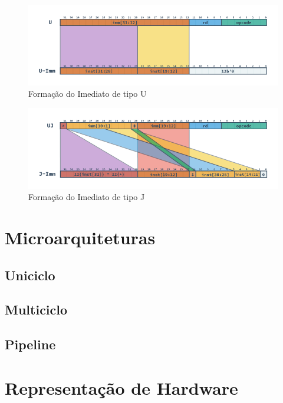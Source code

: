         \begin{figure}[H]
        \centering
            \includegraphics[width=.9\linewidth]{../images/RV_U_Imm.png}
            \caption{Formação do Imediato de tipo U
                }\label{fig:riscv_u_imm}
        \end{figure}

        \begin{figure}[H]
        \centering
            \includegraphics[width=.9\linewidth]{../images/RV_J_Imm.png}
            \caption{Formação do Imediato de tipo J
                }\label{fig:riscv_j_imm}
        \end{figure}


\section{Microarquiteturas}
{}

    \subsection{Uniciclo}
    {}

    \subsection{Multiciclo}
    {}

    \subsection{Pipeline}
    {}

\section{Representação de Hardware}
{}

